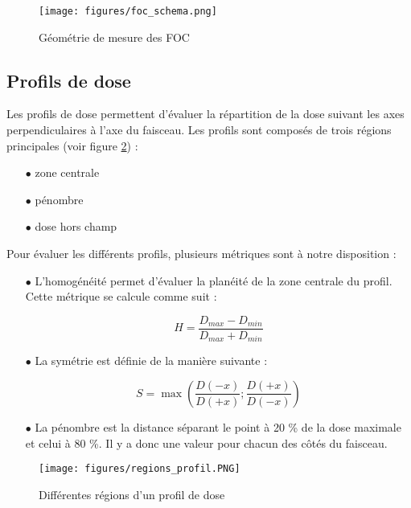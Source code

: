 \documentclass{article}
\begin{document}
\begin{figure}[h]
  \centering
  \texttt{[image: figures/foc\_schema.png]}
  \caption{Géométrie de mesure des FOC \cite{mayles2007handbook}}
  \label{fig_foc}
\end{figure}

\subsection{Profils de dose}

Les profils de dose permettent d'évaluer la répartition de la dose suivant les axes perpendiculaires à l'axe du faisceau. Les profils sont composés de trois régions principales (voir figure \ref*{fig_regions_profil}) :

\begin{itemize}
  \item[$\bullet$] zone centrale
  \item[$\bullet$] pénombre
  \item[$\bullet$] dose hors champ
\end{itemize}

Pour évaluer les différents profils, plusieurs métriques sont à notre disposition :

\begin{itemize}
  \item[$\bullet$] L'homogénéité permet d'évaluer la planéité de la zone centrale du profil. Cette métrique se calcule comme suit :
  
  \begin{equation}
    H = \dfrac{D_{max} - D_{min}}{D_{max} + D_{min}}
    \label{eq_homogeneite}
  \end{equation}
  
  \item[$\bullet$] La symétrie est définie de la manière suivante :
  
  \begin{equation}
    S = \max\left(\dfrac{D(-x)}{D(+x)}; \dfrac{D(+x)}{D(-x)}\right)
    \label{eq_symetrie}
  \end{equation}
  
  \item[$\bullet$] La pénombre est la distance séparant le point à 20 \% de la dose maximale et celui à 80 \%. Il y a donc une valeur pour chacun des côtés du faisceau.  
\end{itemize}

\begin{figure}[h]
  \centering
  \texttt{[image: figures/regions\_profil.PNG]}
  \caption{Différentes régions d'un profil de dose}
  \label{fig_regions_profil}
\end{figure}
\end{document}
